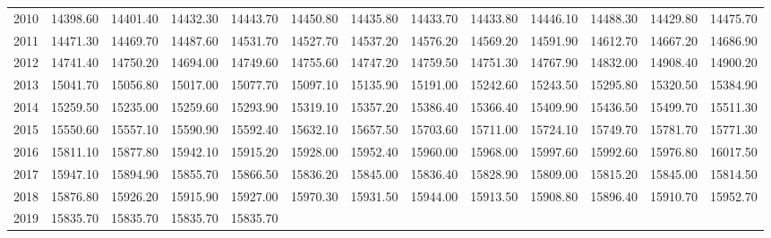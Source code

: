 \begin{longtable}{rrrrrrrrrrrrr}
  2010 & 14398.60 & 14401.40 & 14432.30 & 14443.70 & 14450.80 & 14435.80 & 14433.70 & 14433.80 & 14446.10 & 14488.30 & 14429.80 & 14475.70 \\ 
  2011 & 14471.30 & 14469.70 & 14487.60 & 14531.70 & 14527.70 & 14537.20 & 14576.20 & 14569.20 & 14591.90 & 14612.70 & 14667.20 & 14686.90 \\ 
  2012 & 14741.40 & 14750.20 & 14694.00 & 14749.60 & 14755.60 & 14747.20 & 14759.50 & 14751.30 & 14767.90 & 14832.00 & 14908.40 & 14900.20 \\ 
  2013 & 15041.70 & 15056.80 & 15017.00 & 15077.70 & 15097.10 & 15135.90 & 15191.00 & 15242.60 & 15243.50 & 15295.80 & 15320.50 & 15384.90 \\ 
  2014 & 15259.50 & 15235.00 & 15259.60 & 15293.90 & 15319.10 & 15357.20 & 15386.40 & 15366.40 & 15409.90 & 15436.50 & 15499.70 & 15511.30 \\ 
  2015 & 15550.60 & 15557.10 & 15590.90 & 15592.40 & 15632.10 & 15657.50 & 15703.60 & 15711.00 & 15724.10 & 15749.70 & 15781.70 & 15771.30 \\ 
  2016 & 15811.10 & 15877.80 & 15942.10 & 15915.20 & 15928.00 & 15952.40 & 15960.00 & 15968.00 & 15997.60 & 15992.60 & 15976.80 & 16017.50 \\ 
  2017 & 15947.10 & 15894.90 & 15855.70 & 15866.50 & 15836.20 & 15845.00 & 15836.40 & 15828.90 & 15809.00 & 15815.20 & 15845.00 & 15814.50 \\ 
  2018 & 15876.80 & 15926.20 & 15915.90 & 15927.00 & 15970.30 & 15931.50 & 15944.00 & 15913.50 & 15908.80 & 15896.40 & 15910.70 & 15952.70 \\ 
  2019 & 15835.70 & 15835.70 & 15835.70 & 15835.70 &  &  &  &  &  &  &  &  \\ 
   \hline
\hline
\end{longtable}
